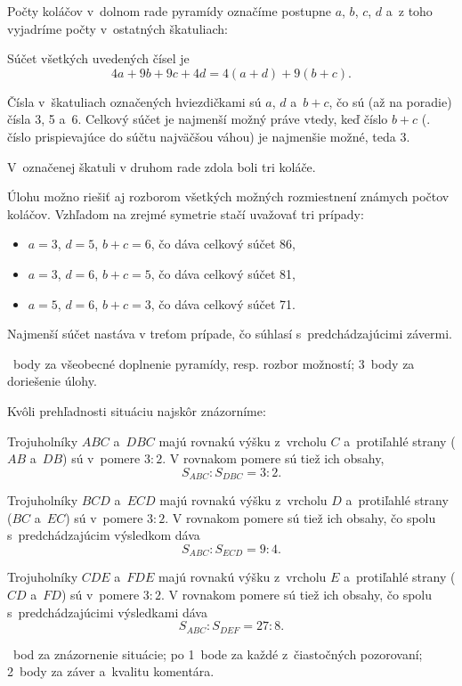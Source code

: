 {%
Počty koláčov v~dolnom rade pyramídy označíme postupne $a$, $b$, $c$, $d$ a~z toho vyjadríme počty v~ostatných škatuliach:
%

Súčet všetkých uvedených čísel je
$$
4a + 9b + 9c + 4d = 4(a+d) + 9(b + c) .
$$

Čísla v~škatuliach označených hviezdičkami sú $a$, $d$ a~$b+c$, čo sú (až na poradie) čísla 3, 5 a~6.
Celkový súčet je najmenší možný práve vtedy, keď číslo $b+c$ (\tj. číslo prispievajúce do súčtu najväčšou váhou) je najmenšie možné, teda 3.

V~označenej škatuli v druhom rade zdola boli tri koláče.

\poznamka
Úlohu možno riešiť aj rozborom všetkých možných rozmiestnení známych počtov koláčov.
Vzhľadom na zrejmé symetrie stačí uvažovať tri prípady:
\begin{itemize}
\item $a=3$, $d=5$, $b+c=6$, čo dáva celkový súčet 86,
\item $a=3$, $d=6$, $b+c=5$, čo dáva celkový súčet 81,
\item $a=5$, $d=6$, $b+c=3$, čo dáva celkový súčet 71.
\end{itemize}
Najmenší súčet nastáva v treťom prípade, čo súhlasí s~predchádzajúcimi závermi.

~body za všeobecné doplnenie pyramídy, resp. rozbor možností;
3~body za doriešenie úlohy.
\eres
}

{%
Kvôli prehľadnosti situáciu najskôr znázorníme:
%

Trojuholníky $ABC$ a~$DBC$ majú rovnakú výšku z~vrcholu $C$ a~protiľahlé strany ($AB$ a~$DB$) sú v~pomere $3:2$.
V rovnakom pomere sú tiež ich obsahy,
$$
S_{ABC}:S_{DBC}=3:2.
$$

Trojuholníky $BCD$ a~$ECD$ majú rovnakú výšku z~vrcholu $D$ a~protiľahlé strany ($BC$ a~$EC$) sú v~pomere $3:2$.
V rovnakom pomere sú tiež ich obsahy, čo spolu s~predchádzajúcim výsledkom dáva
$$
S_{ABC}:S_{ECD}=9:4.
$$

Trojuholníky $CDE$ a~$FDE$ majú rovnakú výšku z~vrcholu $E$ a~protiľahlé strany ($CD$ a~$FD$) sú v~pomere $3:2$.
V rovnakom pomere sú tiež ich obsahy, čo spolu s~predchádzajúcimi výsledkami dáva
$$
S_{ABC}:S_{DEF}=27:8.
$$

~bod za znázornenie situácie;
po 1~bode za každé z~čiastočných pozorovaní;
2~body za záver a~kvalitu komentára.
\eres
}

